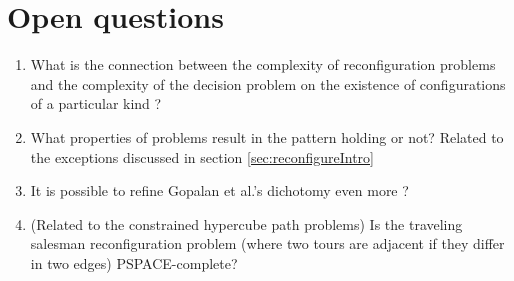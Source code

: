 \section{Open questions}
\begin{enumerate}
    
    \item What is the connection between the complexity of reconfiguration problems and the complexity of the decision problem on the existence of configurations of a particular kind ? 
    
    \item What properties of problems result in the pattern holding or
    not? Related to the exceptions discussed in section \ref{sec:reconfigureIntro}
    
    \item It is possible to refine Gopalan et al.'s dichotomy even more ? 
    \item (Related to the constrained hypercube path problems) Is the traveling salesman reconfiguration problem (where two tours are adjacent if they differ in two edges) PSPACE-complete?

\end{enumerate}
